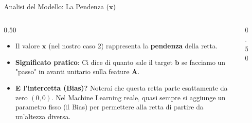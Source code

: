 \documentclass[aspectratio=169, 10pt]{beamer}
\begin{document}
\begin{frame}{Analisi del Modello: La Pendenza ($\mathbf{x}$)}
    \begin{columns}[T]
        \begin{column}{0.50\textwidth}
            \vspace{0.2cm}
            \footnotesize
            \begin{itemize}
                \setlength\itemsep{0.6em}
                \item Il valore $\mathbf{x}$ (nel nostro caso $2$) rappresenta la \textbf{pendenza} della retta.
                
                \item \textbf{Significato pratico}:
                Ci dice di quanto sale il target $\mathbf{b}$ se facciamo un "passo" in avanti unitario sulla feature $\mathbf{A}$.
                
                \item \textbf{E l'intercetta (Bias)?}
                Noterai che questa retta parte esattamente da zero $(0,0)$. Nel Machine Learning reale, quasi sempre si aggiunge un parametro fisso (il Bias) per permettere alla retta di partire da un'altezza diversa.
            \end{itemize}
        \end{column}
        
        \begin{column}{0.50\textwidth}
            \centering
        \end{column}
    \end{columns}
\end{frame}
\end{document}
